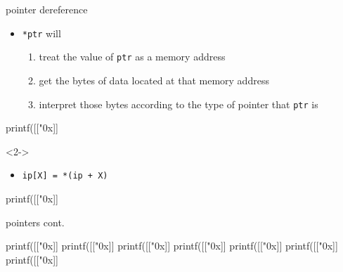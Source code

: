 \documentclass[10pt,t,svgnames]{beamer}
\begin{document}
  \begin{frame}[fragile]{pointer dereference}
    \begin{itemize}
      \item \texttt{*ptr} will
        \begin{enumerate}
          \item treat the value of \texttt{ptr} as a memory address
          \item get the bytes of data located at that memory address
          \item interpret those bytes according to the type of pointer that
            \texttt{ptr} is
        \end{enumerate}
    \end{itemize}
    \begin{codeblock}
    printf([["0x]]%
    \end{codeblock}

    \begin{onlyenv}<2->
      \begin{itemize}
        \item \texttt{ip[X] = *(ip + X)}
      \end{itemize}
      \begin{codeblock}
    printf([["0x]]%
      \end{codeblock}
    \end{onlyenv}

  \end{frame}

  \begin{frame}[fragile]{pointers cont.}
    \begin{codeblock}
    printf([["0x]]%
    printf([["0x]]%
    printf([["0x]]%
    printf([["0x]]%
    printf([["0x]]%
    printf([["0x]]%
    printf([["0x]]%
    \end{codeblock}
  \end{frame}
\end{document}
